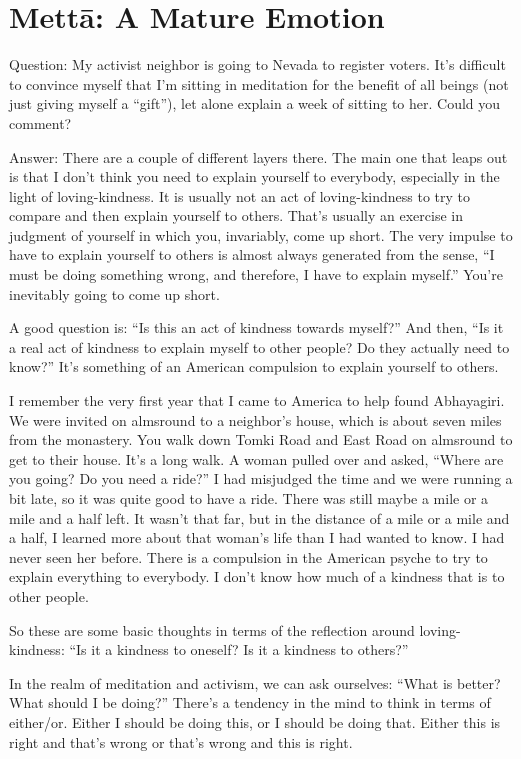 \chapter{Mettā: A Mature Emotion}

\qaspace
Question: My activist neighbor is going to Nevada to register voters.
It’s difficult to convince myself that I’m sitting in meditation for the
benefit of all beings (not just giving myself a “gift”), let alone
explain a week of sitting to her. Could you comment?

\qaspace
Answer: There are a couple of different layers there. The main one that
leaps out is that I don’t think you need to explain yourself to
everybody, especially in the light of loving-kindness. It is usually not
an act of loving-kindness to try to compare and then explain yourself to
others. That’s usually an exercise in judgment of yourself in which you,
invariably, come up short. The very impulse to have to explain yourself
to others is almost always generated from the sense, “I must be doing
something wrong, and therefore, I have to explain myself.” You’re
inevitably going to come up short.

A good question is: “Is this an act of kindness towards myself?” And
then, “Is it a real act of kindness to explain myself to other people?
Do they actually need to know?” It’s something of an American compulsion
to explain yourself to others.

I remember the very first year that I came to America to help found
Abhayagiri. We were invited on almsround to a neighbor’s house, which is
about seven miles from the monastery. You walk down Tomki Road and East
Road on almsround to get to their house. It’s a long walk. A woman
pulled over and asked, “Where are you going? Do you need a ride?” I had
misjudged the time and we were running a bit late, so it was quite good
to have a ride. There was still maybe a mile or a mile and a half left.
It wasn’t that far, but in the distance of a mile or a mile and a half,
I learned more about that woman’s life than I had wanted to know. I had
never seen her before. There is a compulsion in the American psyche to
try to explain everything to everybody. I don’t know how much of a
kindness that is to other people.

So these are some basic thoughts in terms of the reflection around
loving-kindness: “Is it a kindness to oneself? Is it a kindness to
others?”

In the realm of meditation and activism, we can ask ourselves: “What is
better? What should I be doing?” There’s a tendency in the mind to think
in terms of either/or. Either I should be doing this, or I should be
doing that. Either this is right and that’s wrong or that’s wrong and
this is right.

